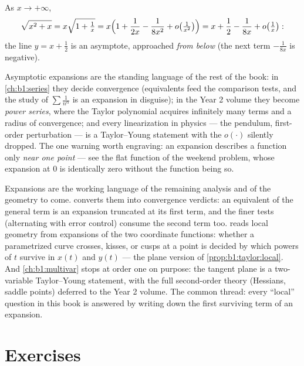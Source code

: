 \begin{example}\label{ex:b1:taylor:asymptote}
As $x \to +\infty$,
\[
\sqrt{x^2 + x} = x\sqrt{1 + \tfrac1x}
= x\Bigl(1 + \frac{1}{2x} - \frac{1}{8x^2} + o\bigl(\tfrac{1}{x^2}\bigr)\Bigr)
= x + \frac12 - \frac{1}{8x} + o\bigl(\tfrac 1x\bigr):
\]
the line $y = x + \frac12$ is an asymptote, approached \emph{from
below} (the next term $-\frac{1}{8x}$ is negative).
\end{example}

\begin{remark}
Asymptotic expansions are the standing language of the rest of
the book: in \cref{ch:b1:series} they decide convergence
(equivalents feed the comparison tests, and the study of $\sum
\frac{1}{n^\alpha}$ is an expansion in disguise); in the Year 2
volume they become \emph{power series}, where the Taylor
polynomial acquires infinitely many terms and a radius of
convergence; and every linearization in physics --- the pendulum,
first-order perturbation --- is a Taylor--Young statement with
the $o(\cdot)$ silently dropped. The one warning worth engraving:
an expansion describes a function only \emph{near one point} ---
see the flat function of the weekend problem, whose expansion at
$0$ is identically zero without the function being so.
\end{remark}

\begin{remark}
Expansions are the working language of the remaining analysis
and of the geometry to come.  converts them
into convergence verdicts: an equivalent of the general term is
an expansion truncated at its first term, and the finer tests
(alternating with error control) consume the second term too.
 reads local geometry from expansions of the
two coordinate functions: whether a parametrized curve crosses,
kisses, or cusps at a point is decided by which powers of $t$
survive in $x(t)$ and $y(t)$ --- the plane version of
\cref{prop:b1:taylor:local}. And \cref{ch:b1:multivar} stops at
order one on purpose: the tangent plane is a two-variable
Taylor--Young statement, with the full second-order theory
(Hessians, saddle points) deferred to the Year 2 volume. The
common thread: every ``local'' question in this book is answered
by writing down the first surviving term of an expansion.
\end{remark}

\section{Exercises}

